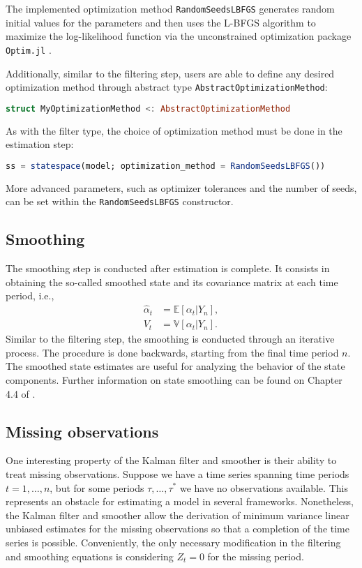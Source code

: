 \documentclass{juliacon}
\begin{document}
The implemented optimization method \texttt{RandomSeedsLBFGS} generates random initial values for the parameters and then uses the L-BFGS algorithm \cite{liu1989limited} to maximize the log-likelihood function via the unconstrained optimization package \texttt{Optim.jl} \cite{mogensen2018optim}.

Additionally, similar to the filtering step, users are able to define any desired optimization method through abstract type \texttt{AbstractOptimizationMethod}:
%
\begin{lstlisting}[language = Julia]
struct MyOptimizationMethod <: AbstractOptimizationMethod
\end{lstlisting}

As with the filter type, the choice of optimization method must be done in the estimation step:
%
\begin{lstlisting}[language = Julia]
ss = statespace(model; optimization_method = RandomSeedsLBFGS())
\end{lstlisting}

More advanced parameters, such as optimizer tolerances and the number of seeds, can be set within the \texttt{RandomSeedsLBFGS} constructor.

\subsection{Smoothing}

The smoothing step is conducted after estimation is complete. It consists in obtaining the so-called smoothed state and its covariance matrix at each time period, i.e.,
%
\begin{align}
    \hat{\alpha}_{t} &= \mathbb{E}[\alpha_{t} | Y_{n}], \\
    V_{t} &= \mathbb{V}[\alpha_{t} | Y_{n}].
\end{align}
%
Similar to the filtering step, the smoothing is conducted through an iterative process. The procedure is done backwards, starting from the final time period $n$. The smoothed state estimates are useful for analyzing the behavior of the state components. Further information on state smoothing can be found on Chapter 4.4 of \cite{durbin2012time}.

\subsection{Missing observations}

One interesting property of the Kalman filter and smoother is their ability to treat missing observations. Suppose we have a time series spanning time periods $t = 1, \dots, n$, but for some periods $\tau, \dots, \tau^{*}$ we have no observations available. This represents an obstacle for estimating a model in several frameworks. Nonetheless, the Kalman filter and smoother allow the derivation of minimum variance linear unbiased estimates for the missing observations so that a completion of the time series is possible. Conveniently, the only necessary modification in the filtering and smoothing equations is considering $Z_{t} = 0$ for the missing period.
\end{document}
